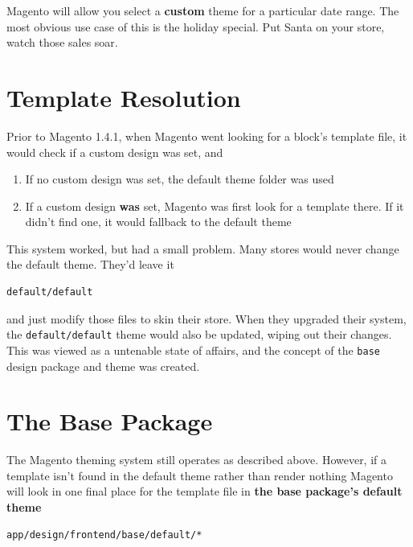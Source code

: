 \documentclass[oneside]{book}
\begin{document}
Magento will allow you select a \textbf{custom} theme for a particular date range.   The most obvious use case of this is the holiday special.  Put Santa on your store, watch those sales soar. 

\section{Template Resolution}

Prior to Magento 1.4.1, when Magento went looking for a block's template file, it would check if a custom design was set, and 

\begin{enumerate}
\item If no custom design was set, the default theme folder was used
\item If a custom design \textbf{was} set, Magento was first look for a template there.  If it didn't find one, it would fallback to the default theme
\end{enumerate}


This system worked, but had a small problem.  Many stores would never change the default theme.  They'd leave it

\begin{lstlisting}
default/default

\end{lstlisting}


and just modify those files to skin their store.  When they upgraded their system, the \footnotesize\texttt{default/default} \normalsize  theme would also be updated, wiping out their changes.  This was viewed as a untenable state of affairs, and the concept of the \footnotesize\texttt{base} \normalsize  design package and theme was created.     

\section{The Base Package}

The Magento theming system still operates as described above. However, if a template isn't found in the default theme rather than render nothing Magento will look in one final place for the template file in \textbf{the base package's default theme}

\begin{lstlisting}
app/design/frontend/base/default/*

\end{lstlisting}
\end{document}

